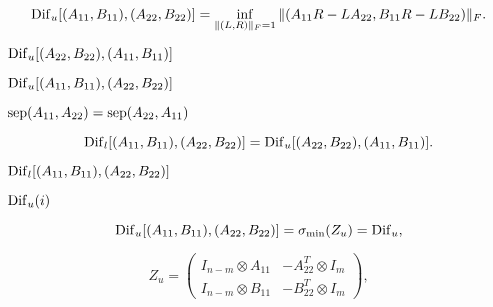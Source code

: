 {\newpage\clearpage
{}%
\begin{displaymath}
{\rm Dif}_u[(A_{11}, B_{11}),(A_{22}, B_{22})] =
\inf_{\|(L,R)\|_F = 1} {\|(A_{11}  R  - L   A_{22},
 B_{11}  R  - L  B_{22})\|_F} .
\end{displaymath}%
\lthtmldisplayZ
\lthtmlcheckvsize\clearpage}

{\newpage\clearpage
{}%
${\rm Dif}_u[(A_{22}, B_{22}),(A_{11}, B_{11})]$%
\lthtmlinlinemathZ
\lthtmlcheckvsize\clearpage}

{\newpage\clearpage
{}%
${\rm Dif}_u[(A_{11}, B_{11}),(A_{22}, B_{22})]$%
\lthtmlinlinemathZ
\lthtmlcheckvsize\clearpage}

{\newpage\clearpage
{}%
${\rm sep}(A_{11}, A_{22}) = {\rm sep}(A_{22}, A_{11})$%
\lthtmlinlinemathZ
\lthtmlcheckvsize\clearpage}

{\newpage\clearpage
{}%
\begin{displaymath}
{\rm Dif}_l[(A_{11}, B_{11}),(A_{22}, B_{22})] =
{\rm Dif}_u[(A_{22}, B_{22}),(A_{11}, B_{11})] .
\end{displaymath}%
\lthtmldisplayZ
\lthtmlcheckvsize\clearpage}

{\newpage\clearpage
{}%
${\rm Dif}_l[(A_{11},
B_{11}),(A_{22}, B_{22})]$%
\lthtmlinlinemathZ
\lthtmlcheckvsize\clearpage}

{\newpage\clearpage
{}%
${\rm Dif}_u(i)$%
\lthtmlinlinemathZ
\lthtmlcheckvsize\clearpage}

{\newpage\clearpage
{}%
\begin{displaymath}
{\rm Dif}_u[(A_{11}, B_{11}),(A_{22}, B_{22})]
= \sigma_{\min} (Z_u)
= {\rm Dif}_u,
\end{displaymath}%
\lthtmldisplayZ
\lthtmlcheckvsize\clearpage}

{\newpage\clearpage
{}%
\begin{displaymath}
Z_u = \left( \begin{array}{cc} I_{n-m} \otimes A_{11} & -A_{22}^T \otimes I_{m} \\
          I_{n-m} \otimes B_{11} & -B_{22}^T \otimes I_{m} \end{array} \right) ,
\end{displaymath}%
\lthtmldisplayZ
\lthtmlcheckvsize\clearpage}

